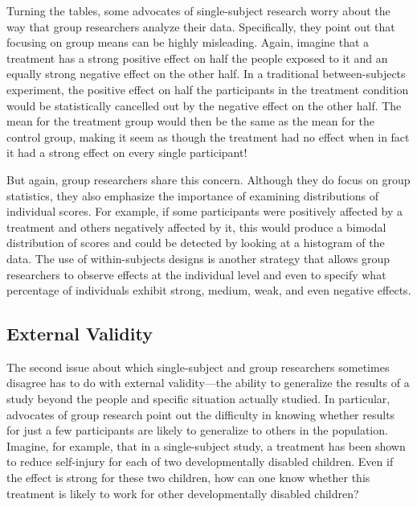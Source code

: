  Turning the tables, some advocates of single-subject research worry about the way that group researchers analyze their data. Specifically, they point out that focusing on group means can be highly misleading. Again, imagine that a treatment has a strong positive effect on half the people exposed to it and an equally strong negative effect on the other half. In a traditional between-subjects experiment, the positive effect on half the participants in the treatment condition would be statistically cancelled out by the negative effect on the other half. The mean for the treatment group would then be the same as the mean for the control group, making it seem as though the treatment had no effect when in fact it had a strong effect on every single participant!

 But again, group researchers share this concern. Although they do focus on group statistics, they also emphasize the importance of examining distributions of individual scores. For example, if some participants were positively affected by a treatment and others negatively affected by it, this would produce a bimodal distribution of scores and could be detected by looking at a histogram of the data. The use of within-subjects designs is another strategy that allows group researchers to observe effects at the individual level and even to specify what percentage of individuals exhibit strong, medium, weak, and even negative effects.

 \subsection{External Validity}

 The second issue about which single-subject and group researchers sometimes disagree has to do with external validity---the ability to generalize the results of a study beyond the people and specific situation actually studied. In particular, advocates of group research point out the difficulty in knowing whether results for just a few participants are likely to generalize to others in the population. Imagine, for example, that in a single-subject study, a treatment has been shown to reduce self-injury for each of two developmentally disabled children. Even if the effect is strong for these two children, how can one know whether this treatment is likely to work for other developmentally disabled children?

